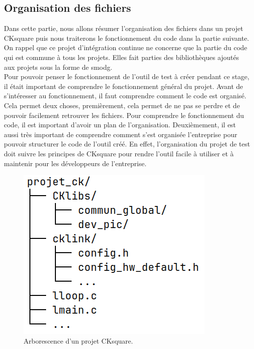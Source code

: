 \documentclass[a4paper]{article}
\begin{document}
\subsection{Organisation des fichiers}
\label{orgaprojck}

Dans cette partie, nous allons résumer l'organisation des fichiers dans un
projet CKsquare puis nous traiterons le fonctionnement du code dans la partie
suivante. On rappel que ce projet d'intégration continue ne concerne que la
partie du code qui est commune à tous les projets. Elles fait parties des
bibliothèques ajoutés aux projets sous la forme de \gls{smodg}. \\

Pour pouvoir penser le fonctionnement de l'outil de test à créer pendant ce
stage, il était important de comprendre le fonctionnement général du projet.
Avant de s'intéresser au fonctionnement, il faut comprendre comment le code est
organisé. Cela permet deux choses, premièrement, cela permet de ne pas se perdre
et de pouvoir facilement retrouver les fichiers. Pour comprendre le
fonctionnement du code, il est important d'avoir un plan de l'organisation.
Deuxièmement, il est aussi très important de comprendre comment s'est organisée
l'entreprise pour pouvoir structurer le code de l'outil créé. En
effet, l'organisation du projet de test doit suivre les principes de CKsquare
pour rendre l'outil facile à utiliser et à maintenir pour les développeurs de
l'entreprise.

\begin{figure}[h!]
  \begin{center}
    \includegraphics[scale=0.5]{./img/arborescence-proj.png}
    \caption{Arborescence d'un projet CKsquare.}
    \label{fig:arbrprojck}
  \end{center}
\end{figure}
\end{document}
